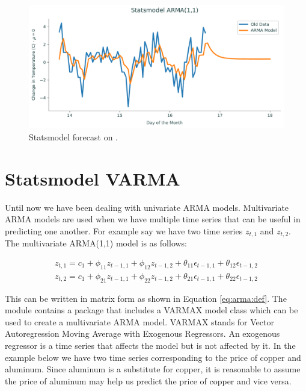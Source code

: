 \begin{figure}[H]
\centering
\includegraphics[width=\textwidth]{figures/sm.pdf}
\caption{Statsmodel forecast on .}
\label{fig:sm}
\end{figure}


\section*{Statsmodel VARMA}
Until now we have been dealing with univariate ARMA models.
Multivariate ARMA models are used when we have multiple time series that can be useful in predicting one another.
For example say we have two time series $z_{t,1}$ and $z_{t,2}$.
The multivariate ARMA(1,1) model is as follows:

\begin{align}
	z_{t,1} = c_1 + \phi_{11} z_{t-1,1} +  \phi_{12} z_{t-1,2} +  \theta_{11} \epsilon_{t-1,1} +  \theta_{12} \epsilon_{t-1,2}
	\\
	z_{t,2} = c_1 + \phi_{21} z_{t-1,1} +  \phi_{22} z_{t-1,2} +  \theta_{21} \epsilon_{t-1,1} +  \theta_{22} \epsilon_{t-1,2}
\end{align}

This can be written in matrix form as shown in Equation \ref{eq:arma:def}.
The module  contains a package that includes a VARMAX model class which can be used to create a multivariate ARMA model.
VARMAX stands for Vector Autoregression Moving Average with Exogenous Regressors.
An exogenous regressor is a time series that affects the model but is not affected by it.
In the example below we have two time series corresponding to the price of copper and aluminum.
Since aluminum is a substitute for copper, it is reasonable to assume the price of aluminum may help us predict the price of copper and vice versa.

